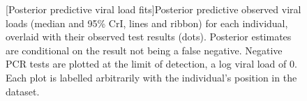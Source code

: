 \documentclass[thesis.tex]{subfiles}
\begin{document}
\begin{figure}
  \vspace{-3cm}
  \captionsetup{width=0.8\paperwidth}
  [Posterior predictive viral load fits]{Posterior predictive observed viral loads (median and 95\% CrI, lines and ribbon) for each individual, overlaid with their observed test results (dots). Posterior estimates are conditional on the result not being a false negative. Negative PCR tests are plotted at the limit of detection, \ie a log viral load of 0. Each plot is labelled arbitrarily with the individual's position in the dataset. \label{ATACCC:fig:goodness-of-fits}}
\end{figure}
\end{document}
